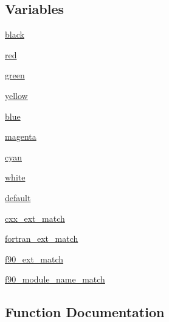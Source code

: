 \subsection*{Variables}
\begin{DoxyCompactItemize}
\item 
\hyperlink{namespacenumpy_1_1distutils_1_1misc__util_adbb9229bf377969a24877160e4a5873d}{black}
\item 
\hyperlink{namespacenumpy_1_1distutils_1_1misc__util_a705a19887384633dca6e57e75ee536ca}{red}
\item 
\hyperlink{namespacenumpy_1_1distutils_1_1misc__util_ac5ea86cfcced45a101c32d5985201e01}{green}
\item 
\hyperlink{namespacenumpy_1_1distutils_1_1misc__util_a0ed19c2175f3ab21834934344c6613bd}{yellow}
\item 
\hyperlink{namespacenumpy_1_1distutils_1_1misc__util_a20ef3a477635e4870c9cee2f40934533}{blue}
\item 
\hyperlink{namespacenumpy_1_1distutils_1_1misc__util_a1a26cb2f7449ba7a6397a1136bb4d5f6}{magenta}
\item 
\hyperlink{namespacenumpy_1_1distutils_1_1misc__util_ac61722c2051f65a474c1b38c3ca95b53}{cyan}
\item 
\hyperlink{namespacenumpy_1_1distutils_1_1misc__util_a85257c19fdb24edd8420ad417855c569}{white}
\item 
\hyperlink{namespacenumpy_1_1distutils_1_1misc__util_a2e2e1334dcb059891c3410a953a21d17}{default}
\item 
\hyperlink{namespacenumpy_1_1distutils_1_1misc__util_ada331358a341f9fc88fee4965d30b568}{cxx\+\_\+ext\+\_\+match}
\item 
\hyperlink{namespacenumpy_1_1distutils_1_1misc__util_af51524565ee28719ebbf99520f1e4aa3}{fortran\+\_\+ext\+\_\+match}
\item 
\hyperlink{namespacenumpy_1_1distutils_1_1misc__util_ae14bb83b59c25ee9ac75b343b8a77c4d}{f90\+\_\+ext\+\_\+match}
\item 
\hyperlink{namespacenumpy_1_1distutils_1_1misc__util_afca1371adcafc9dbce86fc53341bb5fe}{f90\+\_\+module\+\_\+name\+\_\+match}
\end{DoxyCompactItemize}


\subsection{Function Documentation}
\mbox{\label{namespacenumpy_1_1distutils_1_1misc__util_a984628091178ee2038bd27e046983750}} 
